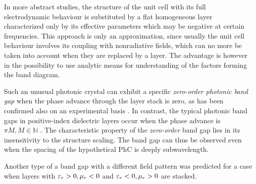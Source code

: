 % 

In more abstract studies, the structure of the unit cell with its full electrodynamic behaviour is substituted by a flat homogeneous layer characterized only by its effective parameters which may be negative at certain frequencies. %
This approach is only an approximation, since usually the unit cell behaviour involves its coupling with nonradiative fields, which can no more be taken into account when they are replaced by a layer. The advantage is however in the possibility to use analytic means for understanding of the factors forming the band diagram.

Such an unusual photonic crystal can exhibit a specific \textit{zero-order photonic band gap} \cite{li2003photonic, chen2006derivation, panoiu2006zero} when the phase advance through the layer stack is zero, as has been confirmed also on an experimental basis \cite{kocaman2011zero}. In contrast, the typical photonic band gaps in positive-index dielectric layers occur when the phase advance is $\pi M, M\in \mathbb{N}$ \cite{joannopoulos2011photonic}. 
The characteristic property of the \textit{zero-order} band gap lies in its insensitivity to the structure scaling. The band gap can thus be observed even when the spacing of the hypothetical PhC is deeply subwavelength.

Another type of a band gap with a different field pattern was predicted \cite{wang2004omnidirectional} for a case when layers with $\varepsilon_r>0, \mu_r<0$ and $\varepsilon_r<0, \mu_r>0$  are stacked. %


